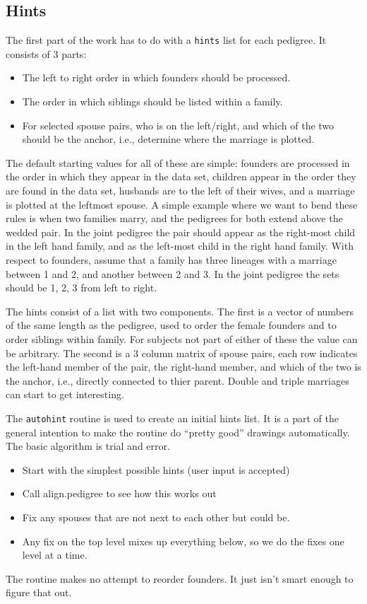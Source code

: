 \documentclass{article}
\begin{document}
\subsection{Hints}

The first part of the work has to do with a \Verb!hints! list for each
pedigree.  It consists of 3 parts:
\begin{itemize}
  \item The left to right order in which founders should be processed.
  \item The order in which siblings should be listed within a family.
  \item For selected spouse pairs, who is on the left/right, and which of the
    two should be the anchor, i.e., determine where the marriage is plotted.
    \end{itemize}
The default starting values for all of these are simple: founders are 
processed in the order in which they appear in the data set, 
children appear in the order they are found in the data set,
husbands are to the left of their wives, and a marriage is plotted
at the leftmost spouse.
A simple example where we want to bend these rules is when two families
marry, and the pedigrees for both extend above the wedded pair.  
In the joint pedigree the
pair should appear as the right-most child in the left hand family, and
as the left-most child in the right hand family.
With respect to founders, assume that a family has three lineages with
a marriage between 1 and 2, and another between 2 and 3.  In the joint
pedigree the sets should be 1, 2, 3 from left to right.  

The hints consist of a list with two components.
The first is a vector of numbers of the same length as the pedigree,
used to order the female founders and to order siblings within
family.  For subjects not part of either of these the value can be 
arbitrary.  
The second is a 3 column matrix of spouse pairs, each row indicates the
left-hand member of the pair, the right-hand member, and which of the two
is the anchor, i.e., directly connected to thier parent.
Double and triple marriages can start to get interesting.


The \Verb!autohint! routine is used to create an initial hints list.
It is a part of the general intention to make the routine do
``pretty good'' drawings automatically.                 
The basic algorithm is trial and error. 
\begin{itemize}
  \item Start with the simplest possible hints (user input is accepted)
  \item Call align.pedigree to see how this works out
  \item Fix any spouses that are not next to each other but could be.
  \item Any fix on the top level mixes up everything below, so we do the
    fixes one level at a time.
\end{itemize}
The routine makes no attempt to reorder founders.  It just isn't smart enough%
to figure that out.
\end{document}
